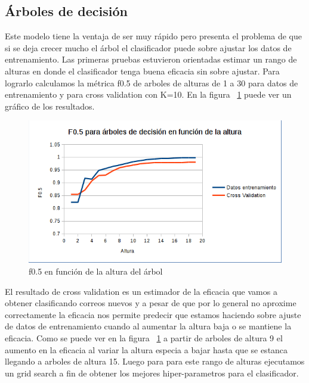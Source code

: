 \subsection{Árboles de decisión}

Este modelo tiene la ventaja de ser muy rápido pero presenta el problema de que si se deja crecer mucho el árbol el clasificador puede sobre ajustar los datos de entrenamiento. Las primeras pruebas estuvieron orientadas estimar un rango de alturas en donde el clasificador tenga buena eficacia sin sobre ajustar. Para lograrlo calculamos la métrica  f0.5 de arboles de alturas de 1 a 30 para datos de entrenamiento y para cross validation con K=10. En la figura ~\ref{fig:arboles_f05_en_funcion_altura} puede ver un gráfico de los resultados.

\begin{figure}[H]
    \centering
        \includegraphics[width=\textwidth]{plots/arboles_f05_en_funcion_altura.png}
        \caption{f0.5 en función de la altura del árbol}
        \label{fig:arboles_f05_en_funcion_altura}
\end{figure}

	El resultado de cross validation es un estimador de la eficacia que vamos a obtener clasificando correos nuevos y a pesar de que por lo general no aproxime correctamente la eficacia nos permite predecir que estamos haciendo sobre ajuste de datos de entrenamiento cuando al aumentar la altura baja o se mantiene la eficacia. Como se puede ver en la figura ~\ref{fig:arboles_f05_en_funcion_altura} a partir de arboles de altura 9 el aumento en la eficacia al variar la altura especia a bajar hasta que se estanca llegando a arboles de altura 15.
    Luego para para este rango de alturas ejecutamos un grid search a fin de obtener los mejores hiper-parametros para el clasificador. 

